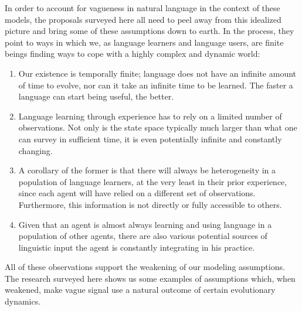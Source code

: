 \documentclass[a4paper]{article}
\begin{document}
In order to account for vagueness in natural language in the context of these models, the proposals surveyed here all need to peel away from this idealized picture and bring some of these assumptions down to earth.
In the process, they point to ways in which we, as language learners and language users, are finite beings finding ways to cope with a highly complex and dynamic world:
\begin{enumerate}
\item Our existence is temporally finite; language does not have an infinite amount of time to evolve, nor can it take an infinite time to be learned. The faster a language can start being useful, the better.
\item Language learning through experience has to rely on a limited number of observations. Not only is the state space typically much larger than what one can survey in sufficient time, it is even potentially infinite and constantly changing.
\item A corollary of the former is that there will always be heterogeneity in a population of language learners, at the very least in their prior experience, since each agent will have relied on a different set of observations. Furthermore, this information is not directly or fully accessible to others.
\item Given that an agent is almost always learning and using language in a population of other agents, there are also various potential sources of linguistic input the agent is constantly integrating in his practice.
\end{enumerate}
All of these observations support the weakening of our modeling assumptions.
The research surveyed here shows us some examples of assumptions which, when weakened, make vague signal use a natural outcome of certain evolutionary dynamics.
\end{document}
